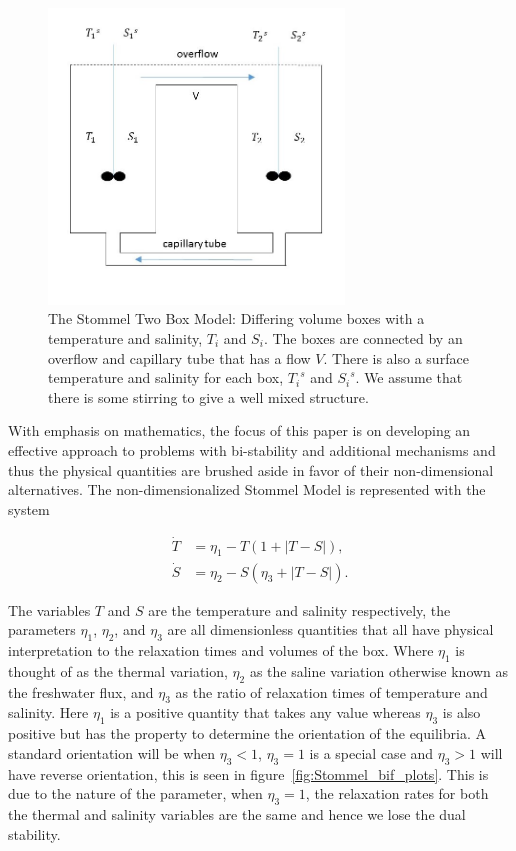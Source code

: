 \begin{figure}[H]
\centering
\includegraphics[width=0.7\textwidth]{intro/box.jpg}
\caption{The Stommel Two Box Model: Differing volume boxes with a temperature and salinity, $T_i$ and $S_i$. The boxes are connected by an overflow and capillary tube that has a flow $V$. There is also a surface temperature and salinity for each box, ${T_i}^s$ and ${S_i}^s$. We assume that there is some stirring to give a well mixed structure.}
\label{fig:stommel_boxes}
\end{figure}

With emphasis on mathematics, the focus of this paper is on developing an effective approach to problems with bi-stability and additional mechanisms and thus the physical quantities are brushed aside in favor of their non-dimensional alternatives. The non-dimensionalized Stommel Model is represented with the system

\begin{equation}
 \begin{aligned}
  \dot{T} & = \eta_1-T(1+|T-S|), \\
  \dot{S}   & = \eta_2-S(\eta_3+|T-S|). 
 \end{aligned}
\end{equation}

The variables $T$ and $S$ are the temperature and salinity respectively, the parameters $\eta_1$, $\eta_2$, and $\eta_3$ are all dimensionless quantities that all have physical interpretation to the relaxation times and volumes of the box. Where $\eta_1$ is thought of as the thermal variation, $\eta_2$ as the saline variation otherwise known as the freshwater flux, and $\eta_3$ as the ratio of relaxation times of temperature and salinity. Here $\eta_1$ is a positive quantity that takes any value whereas $\eta_3$ is also positive but has the property to determine the orientation of the equilibria. A standard orientation will be when $\eta_3<1$, $\eta_3=1$ is a special case and $\eta_3>1$ will have reverse orientation, this is seen in figure~\ref{fig:Stommel_bif_plots}. This is due to the nature of the parameter, when $\eta_3=1$, the relaxation rates for both the thermal and salinity variables are the same and hence we lose the dual stability.

